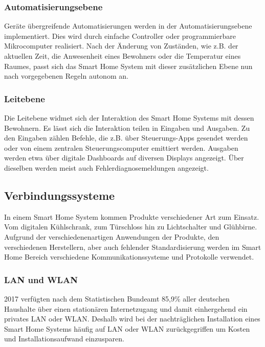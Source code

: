 \subsubsection{Automatisierungsebene}

Geräte übergreifende Automatisierungen werden in der Automatisierungsebene implementiert.
Dies wird durch einfache Controller oder programmierbare Mikrocomputer realisiert.
Nach der Änderung von Zuständen, wie z.B. der aktuellen Zeit, die Anwesenheit eines Bewohners oder die Temperatur eines Raumes, passt sich das Smart Home System mit dieser zusätzlichen Ebene nun nach vorgegebenen Regeln autonom an.

\subsubsection{Leitebene}

Die Leitebene widmet sich der Interaktion des Smart Home Systems mit dessen Bewohnern.
Es lässt sich die Interaktion teilen in Eingaben und Ausgaben.
Zu den Eingaben zählen Befehle, die z.B. über Steuerungs-Apps gesendet werden oder von einem zentralen Steuerungscomputer emittiert werden.
Ausgaben werden etwa über digitale Dashboards auf diversen Displays angezeigt.
Über dieselben werden meist auch Fehlerdiagnosemeldungen angezeigt.


\subsection{Verbindungssysteme}

In einem Smart Home System kommen Produkte verschiedener Art zum Einsatz.
Vom digitalen Kühlschrank, zum Türschloss hin zu Lichtschalter und Glühbirne.
Aufgrund der verschiedenenartigen Anwendungen der Produkte, den verschiedenen Herstellern, aber auch fehlender Standardisierung werden im Smart Home Bereich verschiedene Kommunikationssysteme und Protokolle verwendet.


\subsubsection{LAN und WLAN}

2017 verfügten nach dem Statistischen Bundeamt 85,9\% aller deutschen Haushalte über einen stationären Internetzugang und damit einhergehend ein privates \ac{LAN} oder \ac{WLAN}.
Deshalb wird bei der nachträglichen Installation eines Smart Home Systems häufig auf \ac{LAN} oder \ac{WLAN} zurückgegriffen um Kosten und Installationsaufwand einzusparen.

